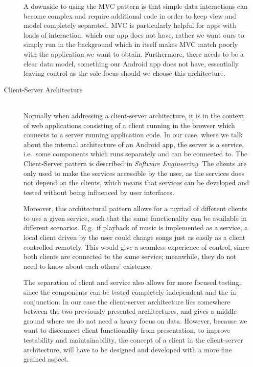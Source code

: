 \begin{description}
A downside to using the MVC pattern is that simple data interactions can become complex and require additional code in order to keep view and model completely separated.
MVC is particularly helpful for apps with loads of interaction, which our app does not have, rather we want ours to simply run in the background which in itself makes MVC match poorly with the application we want to obtain.
Furthermore, there needs to be a clear data model, something our Android app does not have, essentially leaving control as the sole focus should we choose this architecture.

\item[Client-Server Architecture]\hfill\\
Normally when addressing a client-server architecture, it is in the context of web applications consisting of a client running in the browser which connects to a server running application code.
In our case, where we talk about the internal architecture of an Android app, the server is a service, i.e.~some components which runs separately and can be connected to.
The Client-Server pattern is described in \textit{Software Engineering}\cite[p. 180-181]{sommerville}.
The clients are only used to make the services accessible by the user, as the services does not depend on the clients, which means that services can be developed and tested without being influenced by user interfaces.

Moreover, this architectural pattern allows for a myriad of different clients to use a given service, such that the same functionality can be available in different scenarios.
E.g.~if playback of music is implemented as a service, a local client driven by the user could change songs just as easily as a client controlled remotely.
This would give a seamless experience of control, since both clients are connected to the same service; meanwhile, they do not need to know about each others' existence.

The separation of client and service also allows for more focused testing, since the components can be tested completely independent and the in conjunction.
In our case the client-server architecture lies somewhere between the two previously presented architectures, and gives a middle ground where we do not need a heavy focus on data.
However, because we want to disconnect client functionality from presentation, to improve testability and maintainability, the concept of a client in the client-server architecture, will have to be designed and developed with a more fine grained aspect.
\end{description}
